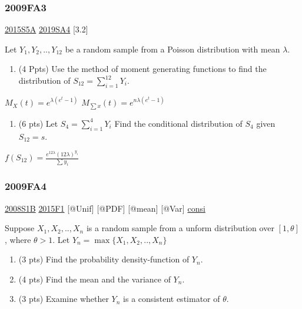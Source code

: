 \documentclass[10pt,twocolumn,portrait]{article}
\providecommand{\tightlist}{%
  \setlength{\itemsep}{0pt}\setlength{\parskip}{0pt}}
\begin{document}
\hypertarget{fa3}{%
\subsubsection{2009FA3}\label{fa3}}

\protect\hyperlink{s5a-1}{2015S5A} \protect\hyperlink{sa4-3}{2019SA4}
{[}3.2{]}

Let \(Y_1,Y_2,..,Y_{12}\) be a random sample from a Poisson distribution
with mean \(\lambda\).

\begin{enumerate}
\def\labelenumi{(\alph{enumi})}
\tightlist
\item
  (4 Ppts) Use the method of moment generating functions to find the
  distribution of \(S_{12}=\sum^{12}_{i=1} Y_i\).
\end{enumerate}

\(M_X(t)=e^{\lambda(e^t-1)}\) \(M_{\sum x}(t)=e^{n\lambda(e^t-1)}\)

\begin{enumerate}
\def\labelenumi{(\alph{enumi})}
\setcounter{enumi}{1}
\tightlist
\item
  (6 pts) Let \(S_4=\sum_{i=1}^4Y_i\) Find the conditional distribution
  of \(S_4\) given \(S_{12}=s\).
\end{enumerate}

\(f(S_{12})=\frac{e^{12\lambda}(12\lambda)^{y_i}}{\sum y_i}\)

\hypertarget{fa4}{%
\subsubsection{2009FA4}\label{fa4}}

\protect\hyperlink{s1b}{2008S1B} \protect\hyperlink{f1-5}{2015F1}
{[}@Unif{]} {[}@PDF{]} {[}@mean{]} {[}@Var{]}
\protect\hyperlink{section-8}{consi}

Suppose \(X_1,X_2,..,X_{n}\) is a random sample from a unform
distribution over \([1,\theta]\), where \(\theta>1\). Let
\(Y_{n}=\max\{X_1,X_2,..,X_{n}\}\)

\begin{enumerate}
\def\labelenumi{(\alph{enumi})}
\item
  (3 pts) Find the probability density-function of \(Y_{n}\).
\item
  (4 pts) Find the mean and the variance of \(Y_{n}\).
\item
  (3 pts) Examine whether \(Y_{n}\) is a consistent estimator of
  \(\theta\).
\end{enumerate}
\end{document}
